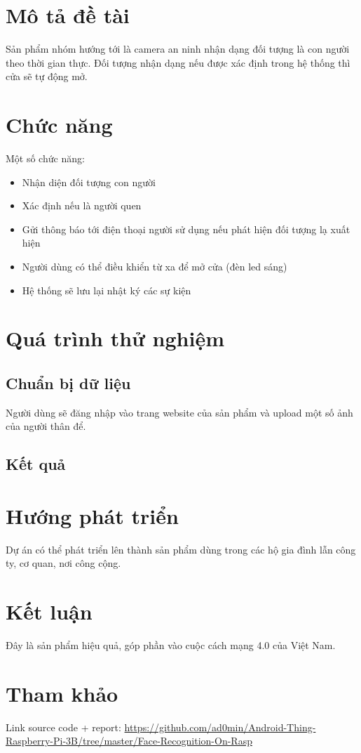 \documentclass[a4paper]{article}
\begin{document}
\newpage
\tableofcontents
\newpage

\section{Mô tả đề tài}
\hspace{6mm} Sản phẩm nhóm hướng tới là camera an ninh nhận dạng đối tượng là con người theo thời gian thực. Đối tượng nhận dạng nếu được xác định trong hệ thống thì cửa sẽ tự động mở.

\section{Chức năng}
	Một số chức năng:
	\begin{itemize}
		\item Nhận diện đối tượng con người
		\item Xác định nếu là người quen
		\item Gửi thông báo tới điện thoại người sử dụng nếu phát hiện đối tượng lạ xuất hiện
		\item Người dùng có thể điều khiển từ xa để mở cửa (đèn led sáng)
		\item Hệ thống sẽ lưu lại nhật ký các sự kiện
	\end{itemize}

\section{Quá trình thử nghiệm}
\subsection{Chuẩn bị dữ liệu}
\hspace{6mm} Người dùng sẽ đăng nhập vào trang website của sản phẩm và upload một số ảnh của người thân để.

\subsection{Kết quả}
\hspace{6mm}

\section{Hướng phát triển}
Dự án có thể phát triển lên thành sản phẩm dùng trong các hộ gia đình lẫn công ty, cơ quan, nơi công cộng. 

\section{Kết luận}
Đây là sản phẩm hiệu quả, góp phần vào cuộc cách mạng 4.0 của Việt Nam.

\section{Tham khảo}
Link source code + report: \url{https://github.com/ad0min/Android-Thing-Raspberry-Pi-3B/tree/master/Face-Recognition-On-Rasp}


 
\end{document}
